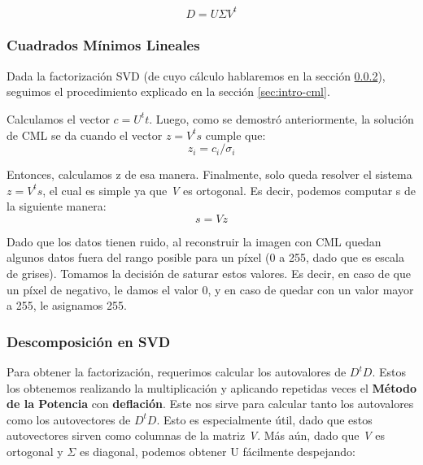 \begin{equation*}
	D = U \Sigma V^{t}
\end{equation*}

\subsubsection{Cuadrados Mínimos Lineales}
Dada la factorización SVD (de cuyo cálculo hablaremos en la sección \ref{sec:desarrollo-svd}),
seguimos el procedimiento explicado en la sección \ref{sec:intro-cml}.

Calculamos el vector $c = U^{t} t$.
Luego, como se demostró anteriormente, la solución de CML se da cuando el vector $z = V^{t} s$ cumple que:
\begin{equation*}
	z_{i} = c_{i}/\sigma_{i}
\end{equation*}

Entonces, calculamos z de esa manera. Finalmente, solo queda resolver el sistema $z = V^{t} s$,
el cual es simple ya que \textit{V} es ortogonal.
Es decir, podemos computar s de la siguiente manera:
\begin{equation*}
	s = V z
\end{equation*}

Dado que los datos tienen ruido, al reconstruir la imagen con CML
quedan algunos datos fuera del rango posible para un píxel
(0 a 255, dado que es escala de grises).
Tomamos la decisión de saturar estos valores.
Es decir, en caso de que un píxel de negativo, le damos el valor 0,
y en caso de quedar con un valor mayor a 255, le asignamos 255.

\subsubsection{Descomposición en SVD}
\label{sec:desarrollo-svd}
Para obtener la factorización, requerimos calcular los autovalores de $D^{t} D$.
Estos los obtenemos realizando la multiplicación
y aplicando repetidas veces el \textbf{Método de la Potencia} con \textbf{deflación}\cite{pot}.
Este nos sirve para calcular tanto los autovalores como los autovectores de $D^{t} D$.
Esto es especialmente útil, dado que estos autovectores sirven como columnas de la matriz \textit{V}.
Más aún, dado que \textit{V} es ortogonal y $\Sigma$ es diagonal, podemos obtener U fácilmente despejando:

